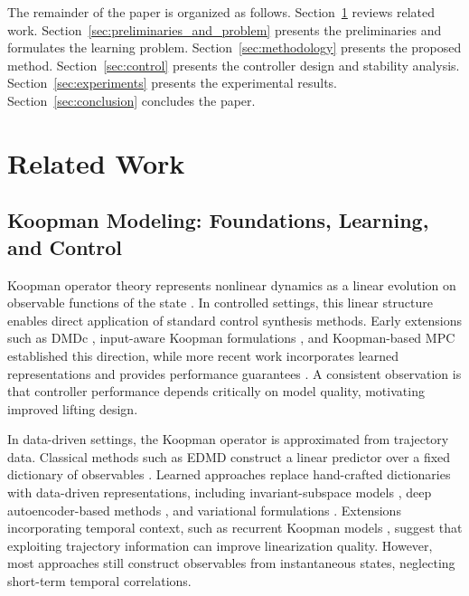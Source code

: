 \documentclass[journal]{IEEEtran}
\begin{document}
The remainder of the paper is organized as follows. Section~\ref{sec:related_work} reviews related work. Section~\ref{sec:preliminaries_and_problem} presents the preliminaries and formulates the learning problem. Section~\ref{sec:methodology} presents the proposed method. Section~\ref{sec:control} presents the controller design and stability analysis. Section~\ref{sec:experiments} presents the experimental results. Section~\ref{sec:conclusion} concludes the paper.

\section{Related Work}
\label{sec:related_work}

\subsection{Koopman Modeling: Foundations, Learning, and Control}

Koopman operator theory represents nonlinear dynamics as a linear evolution on observable functions of the state \cite{koopman1931hamiltonian, koopman1932spectra, mezic2005spectral, rowley2009spectral}. In controlled settings, this linear structure enables direct application of standard control synthesis methods. Early extensions such as DMDc \cite{proctor2016dmdc}, input-aware Koopman formulations \cite{proctor2018generalizing, brunton2016invariant}, and Koopman-based MPC \cite{korda2018linear} established this direction, while more recent work incorporates learned representations and provides performance guarantees \cite{han2020deep, shi2022deep, strasser2026overview, duran2025control}. A consistent observation is that controller performance depends critically on model quality, motivating improved lifting design.

In data-driven settings, the Koopman operator is approximated from trajectory data. Classical methods such as EDMD construct a linear predictor over a fixed dictionary of observables \cite{williams2015data, williams2015kernel, klus2018data}. Learned approaches replace hand-crafted dictionaries with data-driven representations, including invariant-subspace models \cite{takeishi2017koopman}, deep autoencoder-based methods \cite{lusch2018deep, yeung2019learning}, and variational formulations \cite{morton2019deep, yuan2022variational}. Extensions incorporating temporal context, such as recurrent Koopman models \cite{otto2019linearly, rank2019recurrent}, suggest that exploiting trajectory information can improve linearization quality. However, most approaches still construct observables from instantaneous states, neglecting short-term temporal correlations.
\end{document}

